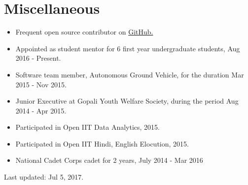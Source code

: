 \documentclass[10pt,a4paper]{moderncv}
\newcommand{\newlink}[2]{
  \href{#1}{\color{blue}#2}
}
\begin{document}
\section*{Miscellaneous}
\begin{itemize}
  \setlength\itemsep{0.5em}
  \item Frequent open source contributor on \newlink{https://github.com/kaustubhhiware}{GitHub.}
  \item Appointed as student mentor for 6 first year undergraduate students, Aug 2016 - Present.
  \item Software team member, Autonomous Ground Vehicle, for the duration Mar 2015 - Nov 2015.
  \item Junior Executive at Gopali Youth Welfare Society, during the period Aug 2014 - Apr 2015.
  \item Participated in Open IIT Data Analytics, 2015.
  \item Participated in Open IIT Hindi, English Elocution, 2015.
  \item National Cadet Corps cadet for 2 years, July 2014 - Mar 2016
\end{itemize}

	\vspace*{\fill}
	\begin{flushright}
	\footnotesize Last updated: Jul 5, 2017.
	\end{flushright}
\end{document}
